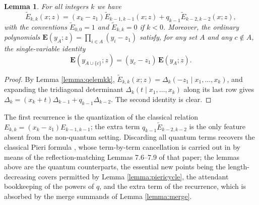 \documentclass{amsart}
\newtheorem{lemma}{Lemma}[section]
\theoremstyle{definition}
\theoremstyle{remark}
\numberwithin{equation}{section}
\newcommand{\wte}{\mathbf{E}}
\newcommand{\qelem}{\widetilde{E}}
\begin{document}
\begin{lemma} \label{lemma:elemrecursion}
For all integers $k$ we have
$$\qelem_{k,k}(x;z)=(x_k-z_1)\qelem_{k-1,k-1}(x;z)+q_{k-1}\qelem_{k-2,k-2}(x;z),$$
with the conventions $\qelem_{0,0}=1$ and $\qelem_{k,k}=0$ if $k<0$. Moreover, the ordinary polynomials $\wte(y_A;z)=\prod_{i\in A}(y_i-z_1)$ satisfy, for any set $A$ and any $c\notin A$, the single-variable identity
$$\wte(y_{A\cup\{c\}};z)=(y_c-z_1)\,\wte(y_A;z).$$
\end{lemma}
\begin{proof}
By Lemma \ref{lemma:qelemkk}, $\qelem_{k,k}(x;z)=\Delta_k(-z_1\mid x_1,\ldots,x_k)$, and expanding the tridiagonal determinant $\Delta_k(t\mid x_1,\ldots,x_k)$ along its last row gives $\Delta_k=(x_k+t)\Delta_{k-1}+q_{k-1}\Delta_{k-2}$. The second identity is clear.
\end{proof}

The first recurrence is the quantization of the classical relation $E_{k,k}=(x_k-z_1)E_{k-1,k-1}$; the extra term $q_{k-1}\qelem_{k-2,k-2}$ is the only feature absent from the non-quantum setting. Discarding all quantum terms recovers the classical Pieri formula \cite[Theorem~7.1]{samuelmolev}, whose term-by-term cancellation is carried out in \cite[Proof of Proposition~4.4]{samuelmolev} by means of the reflection-matching Lemmas 7.6--7.9 of that paper; the lemmas above are the quantum counterparts, the essential new points being the length-decreasing covers permitted by Lemma \ref{lemma:piericycle}, the attendant bookkeeping of the powers of $q$, and the extra term of the recurrence, which is absorbed by the merge summands of Lemma \ref{lemma:merge}.
\end{document}
